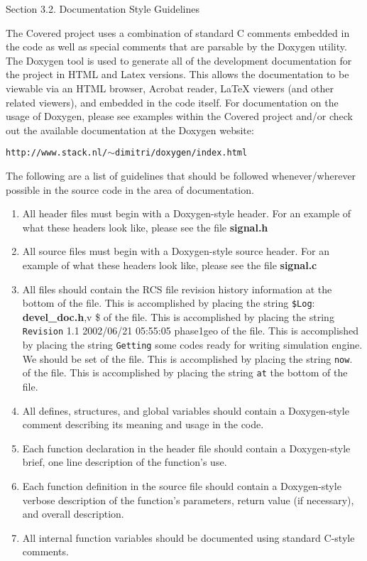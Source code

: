 \begin{Desc}
\item[Section 3.2.  Documentation Style Guidelines]\par
 The Covered project uses a combination of standard C comments embedded in the code as well as special comments that are parsable by the Doxygen utility. The Doxygen tool is used to generate all of the development documentation for the project in HTML and Latex versions. This allows the documentation to be viewable via an HTML browser, Acrobat reader, La\-Te\-X viewers (and other related viewers), and embedded in the code itself. For documentation on the usage of Doxygen, please see examples within the Covered project and/or check out the available documentation at the Doxygen website:

 {\tt http://www.stack.nl/$\sim$dimitri/doxygen/index.html}

 The following are a list of guidelines that should be followed whenever/wherever possible in the source code in the area of documentation.

\begin{enumerate}
\item 
All header files must begin with a Doxygen-style header. For an example of what these  headers look like, please see the file {\bf signal.h}\item 
All source files must begin with a Doxygen-style source header. For an example of what these headers look like, please see the file {\bf signal.c}\item 
All files should contain the RCS file revision history information at the bottom of the file. This is accomplished by placing the string {\tt \$Log}: {\bf devel\_\-doc.h},v \$ of the file. This is accomplished by placing the string {\tt Revision} 1.1 2002/06/21 05:55:05 phase1geo of the file. This is accomplished by placing the string {\tt Getting} some codes ready for writing simulation engine. We should be set of the file. This is accomplished by placing the string {\tt now}. of the file. This is accomplished by placing the string {\tt at} the bottom of the file.\item 
All defines, structures, and global variables should contain a Doxygen-style comment  describing its meaning and usage in the code.\item 
Each function declaration in the header file should contain a Doxygen-style brief, one line description of the function's use.\item 
Each function definition in the source file should contain a Doxygen-style verbose description of the function's parameters, return value (if necessary), and overall description.\item 
All internal function variables should be documented using standard C-style comments.\end{enumerate}
\end{Desc}


